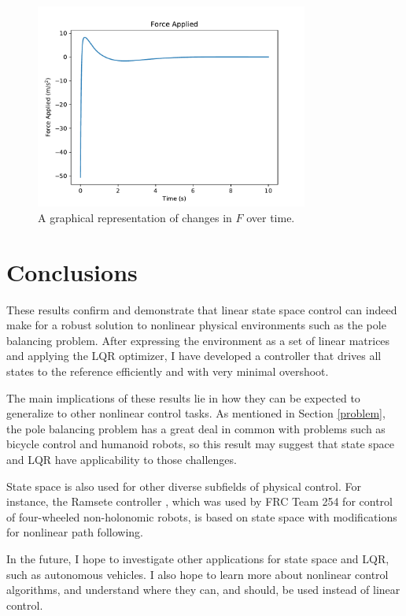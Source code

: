 \documentclass[12pt]{article}
\begin{document}
\begin{figure}[H]
    \centering
    \includegraphics[width=0.8\textwidth]{force}
    \caption{\label{force} A graphical representation of changes in $F$ over time.}
\end{figure}

\section{Conclusions}

These results confirm and demonstrate that linear state space control can indeed make for a robust solution to nonlinear physical environments such as the pole balancing problem. After expressing the environment as a set of linear matrices and applying the LQR optimizer, I have developed a controller that drives all states to the reference efficiently and with very minimal overshoot.

The main implications of these results lie in how they can be expected to generalize to other nonlinear control tasks. As mentioned in Section \ref{problem}, the pole balancing problem has a great deal in common with problems such as bicycle control and humanoid robots, so this result may suggest that state space and LQR have applicability to those challenges.

State space is also used for other diverse subfields of physical control. For instance, the Ramsete controller \cite{ramsete}, which was used by FRC Team 254 for control of four-wheeled non-holonomic robots, is based on state space with modifications for nonlinear path following.

In the future, I hope to investigate other applications for state space and LQR, such as autonomous vehicles. I also hope to learn more about nonlinear control algorithms, and understand where they can, and should, be used instead of linear control.

\printbibliography
\end{document}
